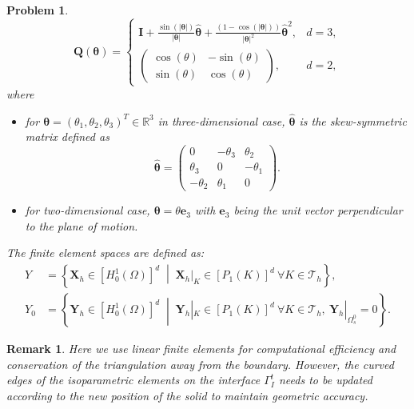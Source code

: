 \documentclass{article}
\newtheorem{problem}{Problem}
\newtheorem{remark}[theorem]{Remark}
\begin{document}
\begin{problem}
\begin{equation}
    \mathbf{Q}(\boldsymbol{\theta}) = \begin{cases}
    \mathbf{I} + \frac{\sin(|\boldsymbol{\theta}|)}{|\boldsymbol{\theta}|}\hat{\boldsymbol{\theta}} + \frac{(1 - \cos(|\boldsymbol{\theta}|))}{|\boldsymbol{\theta}|^2}\hat{\boldsymbol{\theta}}^2, & d=3,\\
    \begin{pmatrix}
    \cos(\theta) & -\sin(\theta) \\
    \sin(\theta) & \cos(\theta)
    \end{pmatrix}, & d=2,
    \end{cases}
\end{equation}
where 
\begin{itemize}
\item for $\boldsymbol{\theta} = (\theta_1, \theta_2, \theta_3)^T \in \mathbb{R}^3$ in three-dimensional case, $\hat{\boldsymbol{\theta}}$ is the skew-symmetric matrix defined as
\[
\hat{\boldsymbol{\theta}} = \begin{pmatrix}
0 & -\theta_3 & \theta_2 \\
\theta_3 & 0 & -\theta_1 \\
-\theta_2 & \theta_1 & 0
\end{pmatrix}.
\]
\item for two-dimensional case, $\boldsymbol{\theta} = \theta \mathbf{e}_3$ with $\mathbf{e}_3$ being the unit vector perpendicular to the plane of motion.
\end{itemize}
The finite element spaces are defined as:
\begin{equation}
    \begin{aligned}
    Y &= \left\{ \mathbf{X}_h \in [H^1_0(\Omega)]^d \;\middle|\; \mathbf{X}_h|_K \in [P_1(K)]^d\ \forall K \in \mathcal{T}_h \right\}, \\
    Y_0 &= \left\{ \mathbf{Y}_h \in [H^1_0(\Omega)]^d \;\middle|\; \mathbf{Y}_h|_K \in [P_1(K)]^d\ \forall K \in \mathcal{T}_h,\ \mathbf{Y}_h|_{\Omega_s^0} = 0 \right\}.
    \end{aligned}
\end{equation}
\end{problem}
\begin{remark}
Here we use linear finite elements for computational efficiency and conservation of the triangulation away from the boundary. However, the curved edges of the isoparametric elements on the interface $\Gamma_I^t$ needs to be updated according to the new position of the solid to maintain geometric accuracy.
\end{remark}
\end{document}
